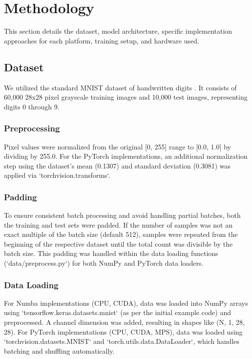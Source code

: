 \documentclass[conference]{IEEEtran} %
\begin{document}
\section{Methodology}
\label{sec:methodology}
This section details the dataset, model architecture, specific implementation approaches for each platform, training setup, and hardware used.

\subsection{Dataset}
We utilized the standard MNIST dataset of handwritten digits \cite{LeCun1998}. It consists of 60,000 28x28 pixel grayscale training images and 10,000 test images, representing digits 0 through 9.
\subsubsection{Preprocessing} Pixel values were normalized from the original [0, 255] range to [0.0, 1.0] by dividing by 255.0. For the PyTorch implementations, an additional normalization step using the dataset's mean (0.1307) and standard deviation (0.3081) was applied via `torchvision.transforms`.
\subsubsection{Padding} To ensure consistent batch processing and avoid handling partial batches, both the training and test sets were padded. If the number of samples was not an exact multiple of the batch size (default 512), samples were repeated from the beginning of the respective dataset until the total count was divisible by the batch size. This padding was handled within the data loading functions (`data/preprocess.py`) for both NumPy and PyTorch data loaders.
\subsubsection{Data Loading} For Numba implementations (CPU, CUDA), data was loaded into NumPy arrays using `tensorflow.keras.datasets.mnist` (as per the initial example code) and preprocessed. A channel dimension was added, resulting in shapes like (N, 1, 28, 28). For PyTorch implementations (CPU, CUDA, MPS), data was loaded using `torchvision.datasets.MNIST` and `torch.utils.data.DataLoader`, which handles batching and shuffling automatically.
\end{document}
